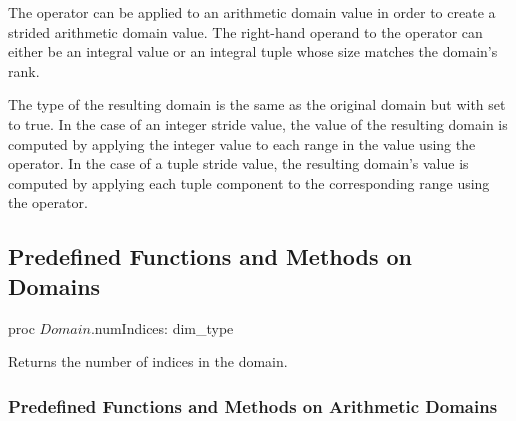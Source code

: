 The  operator can be applied to an arithmetic domain value in
order to create a strided arithmetic domain value.  The right-hand
operand to the  operator can either be an integral value or
an integral tuple whose size matches the domain's rank.


The type of the resulting domain is the same as the original domain
but with  set to true.  In the case of an integer
stride value, the value of the resulting domain is computed by
applying the integer value to each range in the value using the
 operator.  In the case of a tuple stride value, the resulting
domain's value is computed by applying each tuple component to the
corresponding range using the  operator.



\subsection{Predefined Functions and Methods on Domains}

\begin{protohead}
proc $Domain$.numIndices: dim_type
\end{protohead}
\begin{protobody}
Returns the number of indices in the domain.
\end{protobody}



\subsubsection{Predefined Functions and Methods on Arithmetic Domains}


